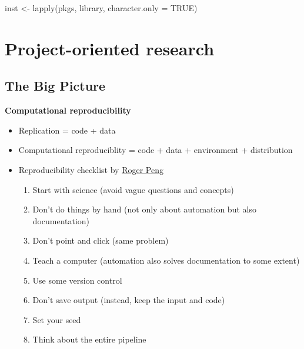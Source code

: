 \documentclass[
  letterpaper,
  DIV=11,
  numbers=noendperiod]{scrreprt}
\newenvironment{Shaded}{\begin{snugshade}}{\end{snugshade}}
\newcommand{\AttributeTok}[1]{\textcolor[rgb]{0.40,0.45,0.13}{#1}}
\newcommand{\ConstantTok}[1]{\textcolor[rgb]{0.56,0.35,0.01}{#1}}
\newcommand{\FunctionTok}[1]{\textcolor[rgb]{0.28,0.35,0.67}{#1}}
\newcommand{\NormalTok}[1]{\textcolor[rgb]{0.00,0.23,0.31}{#1}}
\newcommand{\OtherTok}[1]{\textcolor[rgb]{0.00,0.23,0.31}{#1}}
\begin{document}
\begin{Shaded}
\begin{Highlighting}[]
\NormalTok{inst }\OtherTok{\textless{}{-}} \FunctionTok{lapply}\NormalTok{(pkgs, library, }
               \AttributeTok{character.only =} \ConstantTok{TRUE}\NormalTok{)}
\end{Highlighting}
\end{Shaded}

\hypertarget{project-oriented-research}{%
\section*{Project-oriented research}\label{project-oriented-research}}

\hypertarget{the-big-picture-3}{%
\subsection*{The Big Picture}\label{the-big-picture-3}}

\textbf{Computational reproducibility}

\begin{itemize}
\item
  Replication = code + data
\item
  Computational reproduciblity = code + data + environment +
  distribution
\item
  Reproducibility checklist by
  \href{http://www.biostat.jhsph.edu/~rpeng/}{Roger Peng}

  \begin{enumerate}
  \def\labelenumi{\arabic{enumi}.}
  \item
    Start with science (avoid vague questions and concepts)
  \item
    Don't do things by hand (not only about automation but also
    documentation)
  \item
    Don't point and click (same problem)
  \item
    Teach a computer (automation also solves documentation to some
    extent)
  \item
    Use some version control
  \item
    Don't save output (instead, keep the input and code)
  \item
    Set your seed
  \item
    Think about the entire pipeline
  \end{enumerate}
\end{itemize}
\end{document}
